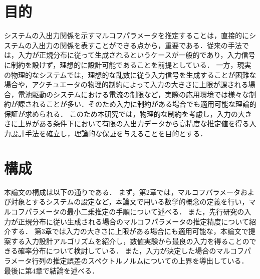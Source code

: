 \section{目的}
システムの入出力関係を示すマルコフパラメータを推定することは，直接的にシステムの入出力の関係を表すことができる点から，重要である．従来の手法では，入力が正規分布に従って生成されるというケースが一般的であり，入力信号に制約を設けず，理想的に設計可能であることを前提としている．
一方，現実の物理的なシステムでは，理想的な乱数に従う入力信号を生成することが困難な場合や，アクチュエータの物理的制約によって入力の大きさに上限が課される場合，電池駆動のシステムにおける電流の制限など，実際の応用環境では様々な制約が課されることが多い．そのため入力に制約がある場合でも適用可能な理論的保証が求められる．
このため本研究では，物理的な制約を考慮し，入力の大きさに上界がある条件下において有限の入出力データから高精度な推定値を得る入力設計手法を確立し，理論的な保証を与えることを目的とする．

\section{構成}
本論文の構成は以下の通りである．
まず，第2章では，マルコフパラメータおよび対象とするシステムの設定など，本論文で用いる数学的概念の定義を行い，マルコフパラメータの最小二乗推定の手順について述べる． 
また，先行研究の入力が正規分布に従い生成される場合のマルコフパラメータの推定精度について紹介する．
第3章では入力の大きさに上限がある場合にも適用可能な，本論文で提案する入力設計アルゴリズムを紹介し，数値実験から最良の入力を得ることのできる確率分布について検討している．
また，入力が決定した場合のマルコフパラメータ行列の推定誤差のスペクトルノルムについての上界を導出している．
最後に第4章で結論を述べる．

